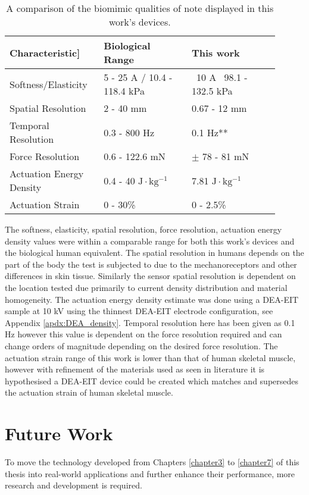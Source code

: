 \begin{table}
	\label{tab:biomimic-compare}
	\caption{A comparison of the biomimic qualities of note displayed in this work's devices.}
\begin{tabular}{|p{0.3\linewidth}|p{0.3\linewidth}|p{0.3\linewidth}|} 
	\textbf{Characteristic]} &
	\textbf{Biological Range} &
	\textbf{This work} \\ \hline
	Softness/Elasticity & 5 - 25 A / 10.4 - 118.4 kPa & ~10 A \ 98.1 - 132.5 kPa \\ \hline
	Spatial Resolution & 2 - 40 mm & 0.67 - 12 mm \\ \hline
	Temporal Resolution & 0.3 - 800 Hz & 0.1 Hz** \\ \hline
	Force Resolution & 0.6 - 122.6 mN & $\pm$ 78 - 81 mN \\ \hline
	Actuation Energy Density & 0.4 - 40 $\mathrm{J\cdot kg^{-1}}$ & 7.81 $\mathrm{J\cdot kg^{-1}}$ \\ \hline
	Actuation Strain & 0 - 30\% &	0 - 2.5\% \\ \hline
\end{tabular}
\end{table}

The softness, elasticity, spatial resolution, force resolution, actuation energy density values were within a comparable range for both this work's devices and the biological human equivalent. The spatial resolution in humans depends on the part of the body the test is subjected to due to the mechanoreceptors and other differences in skin tissue. Similarly the sensor spatial resolution is dependent on the location tested due primarily to current density distribution and material homogeneity. The actuation energy density estimate was done using a DEA-EIT sample at 10 kV using the thinnest DEA-EIT electrode configuration, see Appendix \ref{apdx:DEA_density}. Temporal resolution here has been given as 0.1 Hz however this value is dependent on the force resolution required and can change orders of magnitude depending on the desired force resolution. The actuation strain range of this work is lower than that of human skeletal muscle, however with refinement of the materials used as seen in literature it is hypothesised a DEA-EIT device could be created which matches and supersedes the actuation strain of human skeletal muscle.


\section{Future Work}
To move the technology developed from Chapters \ref{chapter3} to \ref{chapter7} of this thesis into real-world applications and further enhance their performance, more research and development is required.

